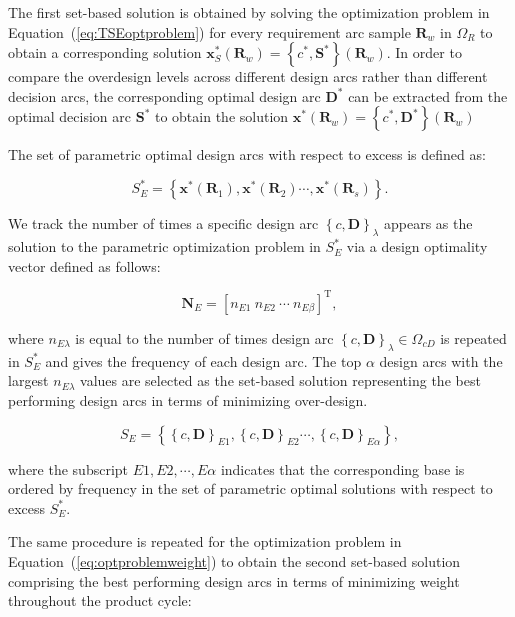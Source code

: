 The first set-based solution is obtained by solving the optimization problem in Equation~(\ref{eq:TSEoptproblem}) for every requirement arc sample $\mathbf{R}_w$ in $\Omega_R$ to obtain a corresponding solution $\mathbf{x}_S^*(\mathbf{R}_w) = \left\{c^*,\mathbf{S}^*\right\}(\mathbf{R}_w)$. In order to compare the overdesign levels across different design arcs rather than different decision arcs, the corresponding optimal design arc $\mathbf{D}^*$ can be extracted from the optimal decision arc $\mathbf{S}^*$ to obtain the solution $\mathbf{x}^*(\mathbf{R}_w) = \left\{c^*,\mathbf{D}^*\right\}(\mathbf{R}_w)$

The set of parametric optimal design arcs with respect to excess is defined as:

\begin{equation} \label{eq:SBDexcessopt}
	S_E^* = \left\{\mathbf{x}^*(\mathbf{R}_1),\mathbf{x}^*(\mathbf{R}_2)\cdots,\mathbf{x}^*(\mathbf{R}_s)\right\}.
\end{equation}

We track the number of times a specific design arc $\left\{c,\mathbf{D}\right\}_\lambda$ appears as the solution to the parametric optimization problem in $S_E^*$ via a design optimality vector defined as follows:

\begin{equation} \label{eq:optimalityvec}
	\mathbf{N}_E = \left[n_{E1} ~ n_{E2} ~ \cdots ~ n_{E\beta}\right]^{\mathrm{T}},
\end{equation}

where $n_{E\lambda}$ is equal to the number of times design arc $\left\{c,\mathbf{D}\right\}_\lambda \in \Omega_{cD}$ is repeated in $S_E^*$ and gives the frequency of each design arc. The top $\alpha$ design arcs with the largest $n_{E\lambda}$ values are selected as the set-based solution representing the best performing design arcs in terms of minimizing over-design.

\begin{equation} \label{eq:SBDexcess}
	S_E = \left\{\left\{c,\mathbf{D}\right\}_{E1},\left\{c,\mathbf{D}\right\}_{E2}\cdots,\left\{c,\mathbf{D}\right\}_{E\alpha}\right\},
\end{equation}

where the subscript $E1,E2,\cdots,E\alpha$ indicates that the corresponding base is ordered by frequency in the set of parametric optimal solutions with respect to excess $S_E^*$.

The same procedure is repeated for the optimization problem in Equation~(\ref{eq:optproblemweight}) to obtain the second set-based solution comprising the best performing design arcs in terms of minimizing weight throughout the product cycle:

